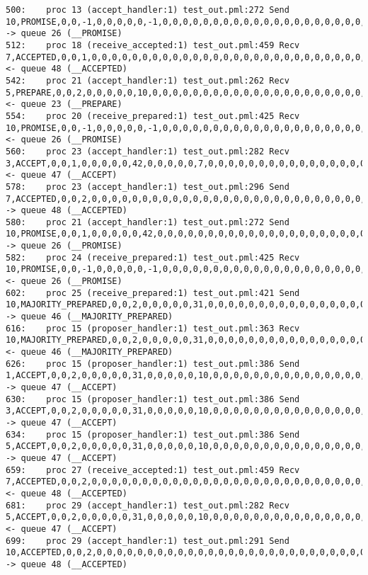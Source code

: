 \begin{lstlisting}[xleftmargin=.01\linewidth, xrightmargin=0.01\linewidth, caption={Message passing caused by the proposer's protocol bug.}, label={lst:paxos_bug}]
500:    proc 13 (accept_handler:1) test_out.pml:272 Send 10,PROMISE,0,0,-1,0,0,0,0,0,-1,0,0,0,0,0,0,0,0,0,0,0,0,0,0,0,0,0,0,0,0,0,0,0,0,0,0,0   -> queue 26 (__PROMISE)
512:    proc 18 (receive_accepted:1) test_out.pml:459 Recv 7,ACCEPTED,0,0,1,0,0,0,0,0,0,0,0,0,0,0,0,0,0,0,0,0,0,0,0,0,0,0,0,0,0,0,0,0,0,0,0,0   <- queue 48 (__ACCEPTED)
542:    proc 21 (accept_handler:1) test_out.pml:262 Recv 5,PREPARE,0,0,2,0,0,0,0,0,10,0,0,0,0,0,0,0,0,0,0,0,0,0,0,0,0,0,0,0,0,0,0,0,0,0,0,0     <- queue 23 (__PREPARE)
554:    proc 20 (receive_prepared:1) test_out.pml:425 Recv 10,PROMISE,0,0,-1,0,0,0,0,0,-1,0,0,0,0,0,0,0,0,0,0,0,0,0,0,0,0,0,0,0,0,0,0,0,0,0,0,0 <- queue 26 (__PROMISE)
560:    proc 23 (accept_handler:1) test_out.pml:282 Recv 3,ACCEPT,0,0,1,0,0,0,0,0,42,0,0,0,0,0,7,0,0,0,0,0,0,0,0,0,0,0,0,0,0,0,0,0,0,0,0,0      <- queue 47 (__ACCEPT)
578:    proc 23 (accept_handler:1) test_out.pml:296 Send 7,ACCEPTED,0,0,2,0,0,0,0,0,0,0,0,0,0,0,0,0,0,0,0,0,0,0,0,0,0,0,0,0,0,0,0,0,0,0,0,0     -> queue 48 (__ACCEPTED)
580:    proc 21 (accept_handler:1) test_out.pml:272 Send 10,PROMISE,0,0,1,0,0,0,0,0,42,0,0,0,0,0,0,0,0,0,0,0,0,0,0,0,0,0,0,0,0,0,0,0,0,0,0,0    -> queue 26 (__PROMISE)
582:    proc 24 (receive_prepared:1) test_out.pml:425 Recv 10,PROMISE,0,0,-1,0,0,0,0,0,-1,0,0,0,0,0,0,0,0,0,0,0,0,0,0,0,0,0,0,0,0,0,0,0,0,0,0,0 <- queue 26 (__PROMISE)
602:    proc 25 (receive_prepared:1) test_out.pml:421 Send 10,MAJORITY_PREPARED,0,0,2,0,0,0,0,0,31,0,0,0,0,0,0,0,0,0,0,0,0,0,0,0,0,0,0,0,0,0,0,0,0,0,0,0        -> queue 46 (__MAJORITY_PREPARED)
616:    proc 15 (proposer_handler:1) test_out.pml:363 Recv 10,MAJORITY_PREPARED,0,0,2,0,0,0,0,0,31,0,0,0,0,0,0,0,0,0,0,0,0,0,0,0,0,0,0,0,0,0,0,0,0,0,0,0        <- queue 46 (__MAJORITY_PREPARED)
626:    proc 15 (proposer_handler:1) test_out.pml:386 Send 1,ACCEPT,0,0,2,0,0,0,0,0,31,0,0,0,0,0,10,0,0,0,0,0,0,0,0,0,0,0,0,0,0,0,0,0,0,0,0,0   -> queue 47 (__ACCEPT)
630:    proc 15 (proposer_handler:1) test_out.pml:386 Send 3,ACCEPT,0,0,2,0,0,0,0,0,31,0,0,0,0,0,10,0,0,0,0,0,0,0,0,0,0,0,0,0,0,0,0,0,0,0,0,0   -> queue 47 (__ACCEPT)
634:    proc 15 (proposer_handler:1) test_out.pml:386 Send 5,ACCEPT,0,0,2,0,0,0,0,0,31,0,0,0,0,0,10,0,0,0,0,0,0,0,0,0,0,0,0,0,0,0,0,0,0,0,0,0   -> queue 47 (__ACCEPT)
659:    proc 27 (receive_accepted:1) test_out.pml:459 Recv 7,ACCEPTED,0,0,2,0,0,0,0,0,0,0,0,0,0,0,0,0,0,0,0,0,0,0,0,0,0,0,0,0,0,0,0,0,0,0,0,0   <- queue 48 (__ACCEPTED)
681:    proc 29 (accept_handler:1) test_out.pml:282 Recv 5,ACCEPT,0,0,2,0,0,0,0,0,31,0,0,0,0,0,10,0,0,0,0,0,0,0,0,0,0,0,0,0,0,0,0,0,0,0,0,0     <- queue 47 (__ACCEPT)
699:    proc 29 (accept_handler:1) test_out.pml:291 Send 10,ACCEPTED,0,0,2,0,0,0,0,0,0,0,0,0,0,0,0,0,0,0,0,0,0,0,0,0,0,0,0,0,0,0,0,0,0,0,0,0    -> queue 48 (__ACCEPTED)

\end{lstlisting}
